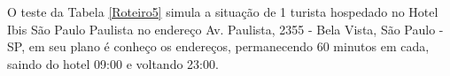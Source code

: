 \begin{center}
	\label{fig:Uninove-Entregador2}
\end{center}

\pagebreak
O teste da Tabela \ref{Roteiro5} simula a situação de 1 turista hospedado no Hotel Ibis São Paulo Paulista no endereço Av. Paulista, 2355 - Bela Vista, São Paulo - SP, em seu plano é conheço os endereços, permanecendo 60 minutos em cada, saindo do hotel 09:00 e voltando 23:00.

